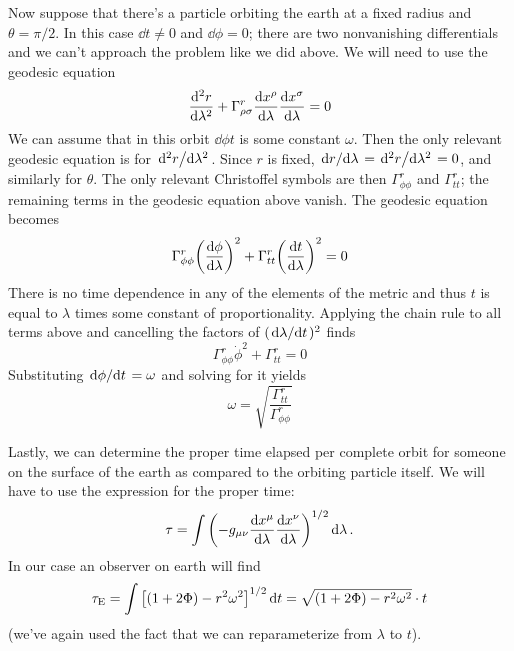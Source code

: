 \documentclass{report}
\begin{document}
Now suppose that there's a particle orbiting the earth at a fixed radius and 
$ \theta = \pi/2 $. In this case $ \dd{t}\neq 0 $ and $ \dd{\phi} = 0 $; there 
are two nonvanishing differentials and we can't approach the problem like we did 
above. We will need to use the geodesic equation
\begin{equation*}
	\dv[2]{r}{\lambda} + \Gamma_{\rho\sigma}^{r} \dv{x^\rho}{\lambda}
		\dv{x^\sigma}{\lambda} = 0
\end{equation*}
We can assume that in this orbit $ \dd{\phi}{t} $ is some constant $ \omega $. 
Then the only relevant geodesic equation is for $ \dv*[2]{r}{\lambda} $.
Since $ r $ is fixed, $ \dv*{r}{\lambda} = \dv*[2]{r}{\lambda} =0 $, and
similarly for $ \theta $.  The only relevant Christoffel symbols are then $
\Gamma_{\phi\phi}^r $ and $ \Gamma_{tt}^r $; the remaining terms in the geodesic
equation above vanish. The geodesic equation becomes 
\begin{equation*}
	\Gamma_{\phi\phi}^r \qty( \dv{\phi}{\lambda} )^2 
		+ \Gamma_{tt}^r \qty( \dv{t}{\lambda} )^2 = 0
\end{equation*}
There is no time dependence in any of the elements of the metric and thus 
$ t $ is equal to $ \lambda $ times some constant of proportionality. Applying 
the chain rule to all terms above and cancelling the factors of $ (\dv*{\lambda}{t})^2 $
finds 
\begin{equation*}
	\Gamma_{\phi\phi}^r\dot{\phi}^2 + \Gamma_{tt}^r = 0
\end{equation*}
Substituting $ \dv*{\phi}{t} = \omega $ and solving for it yields 
\begin{equation*}
	\omega = \sqrt{\frac{\Gamma_{tt}^r}{\Gamma_{\phi\phi}^r}}
\end{equation*}

Lastly, we can determine the proper time elapsed per complete orbit for someone 
on the surface of the earth as compared to the orbiting particle itself. 
We will have to use the expression for the proper time: 
\begin{equation*}
	\tau = \int \qty( -g_{\mu\nu} \dv{x^\mu}{\lambda} \dv{x^\nu}{\lambda} )^{1/2}
		\dd{\lambda}.
\end{equation*}
In our case an observer on earth will find 
\begin{equation*}
	\tau_{\text{E}} = \int\qty[ (1+2\Phi) - r^2 \omega^2 ]^{1/2}\dd{t}
		= \sqrt{(1+2\Phi) - r^2\omega^2} \cdot t
\end{equation*}
(we've again used the fact that we can reparameterize from $ \lambda $ to $ t $).
\end{document}
